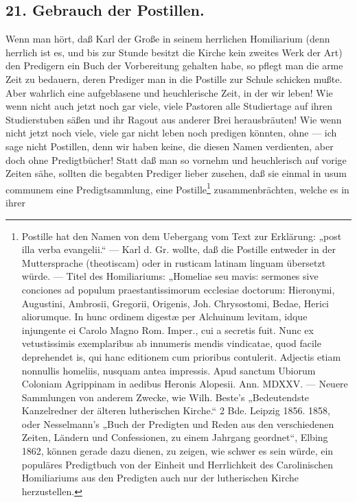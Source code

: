 \subsection*{21. Gebrauch der Postillen.}

Wenn man hört, daß Karl der Große in seinem herrlichen Homiliarium (denn herrlich ist es, und bis zur Stunde besitzt die Kirche kein zweites Werk der Art) den Predigern
ein Buch der Vorbereitung gehalten habe, so pflegt man die arme Zeit zu bedauern, deren Prediger man in die Postille zur Schule schicken mußte. Aber wahrlich eine aufgeblasene und heuchlerische Zeit, in der wir leben! Wie wenn nicht auch jetzt noch gar viele, viele Pastoren alle Studiertage auf ihren Studierstuben säßen und ihr Ragout aus anderer Brei herausbräuten! Wie wenn nicht jetzt noch viele, viele gar nicht leben noch predigen könnten, ohne — ich sage nicht Postillen, denn wir haben keine, die diesen Namen verdienten, aber doch ohne Predigtbücher! Statt daß man so vornehm und heuchlerisch auf vorige Zeiten sähe, sollten die begabten Prediger lieber zusehen, daß sie einmal in usum communem eine Predigtsammlung, eine Postille\footnote{Postille hat den Namen von dem Uebergang vom Text zur Erklärung: „post illa verba evangelii.“ — Karl d. Gr. wollte, daß die Postille entweder in der Muttersprache (theotiscam) oder in rusticam latinam linguam übersetzt würde. — Titel des Homiliariums: „Homeliae seu mavis: sermones sive conciones ad populum praestantissimorum ecclesiae doctorum: Hieronymi, Augustini, Ambrosii, Gregorii, Origenis, Joh. Chrysostomi, Bedae, Herici aliorumque. In hunc ordinem digestæ per Alchuinum levitam, idque injungente ei Carolo Magno Rom. Imper., cui a secretis fuit. Nunc ex vetustissimis exemplaribus ab innumeris mendis vindicatae, quod facile deprehendet is, qui hanc editionem cum prioribus contulerit. Adjectis etiam nonnullis homeliis, nusquam antea impressis. Apud sanctum Ubiorum Coloniam Agrippinam in aedibus Heronis Alopesii. Ann. MDXXV. — Neuere Sammlungen von anderem Zwecke, wie Wilh. Beste’s „Bedeutendste Kanzelredner der älteren lutherischen Kirche.“ 2 Bde. Leipzig 1856. 1858, oder Nesselmann’s „Buch der Predigten und Reden aus den verschiedenen Zeiten, Ländern und Confessionen, zu einem Jahrgang geordnet“, Elbing 1862, können gerade dazu dienen, zu zeigen, wie schwer es sein würde, ein populäres Predigtbuch von der Einheit und Herrlichkeit des Carolinischen Homiliariums aus den Predigten auch nur der lutherischen Kirche herzustellen.} zusammenbrächten, welche es in ihrer
